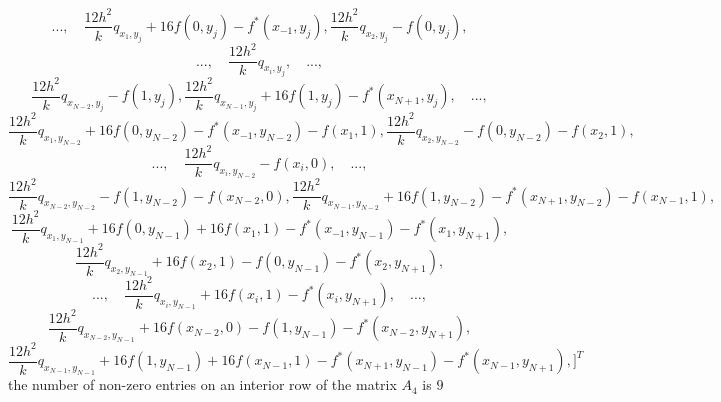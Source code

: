 \documentclass{article}
\begin{document}
\[
...,\quad \frac{12h^2}{k}q_{x_1, y_j} + 16f(0, y_j) - f^{*}(x_{-1}, y_j),\frac{12h^2}{k}q_{x_2, y_j} - f(0, y_j),
\]
\[
 ...,\quad \frac{12h^2}{k}q_{x_i, y_j},\quad...,
\]
\[
\frac{12h^2}{k}q_{x_{N-2}, y_j}  - f(1, y_j), \frac{12h^2}{k}q_{x_{N-1}, y_j} + 16f(1, y_j) - f^{*}(x_{N+1}, y_j),\quad...,
\]
\[
\frac{12h^2}{k}q_{x_1, y_{N-2}} + 16f(0, y_{N-2}) - f^{*}(x_{-1}, y_{N-2}) - f(x_1, 1),\frac{12h^2}{k}q_{x_2, y_{N-2}} - f(0, y_{N-2}) - f(x_2, 1), 
\]
\[
 ...,\quad \frac{12h^2}{k}q_{x_i, y_{N-2}} - f(x_i, 0),\quad...,
\]
\[
\frac{12h^2}{k}q_{x_{N-2}, y_{N-2}}  - f(1, y_{N-2}) - f(x_{N-2}, 0), \frac{12h^2}{k}q_{x_{N-1}, y_{N-2}} + 16f(1, y_{N-2}) - f^{*}(x_{N+1}, y_{N-2}) - f(x_{N-1}, 1),
\]
\[
\frac{12h^2}{k}q_{x_1, y_{N-1}} + 16f(0, y_{N-1}) + 16f(x_1, 1) - f^{*}(x_{-1}, y_{N-1}) - f^{*}(x_1, y_{N+1}),
\]
\[
\frac{12h^2}{k}q_{x_2, y_{N-1}} + 16f(x_2, 1) - f(0, y_{N-1}) - f^{*}(x_2, y_{N+1}), 
\]
\[
 ...,\quad \frac{12h^2}{k}q_{x_i, y_{N-1}} + 16f(x_i, 1) - f^{*}(x_i, y_{N+1}),\quad...,
\]
\[
\frac{12h^2}{k}q_{x_{N-2}, y_{N-1}} + 16f(x_{N-2}, 0) - f(1, y_{N-1}) - f^{*}(x_{N-2}, y_{N+1}),
\]
\[
\frac{12h^2}{k}q_{x_{N-1}, y_{N-1}} + 16f(1, y_{N-1}) + 16f(x_{N-1}, 1) - f^{*}(x_{N+1}, y_{N-1}) - f^{*}(x_{N-1}, y_{N+1}),]^T
\]
the number of non-zero entries on an interior row of the matrix $A_4$ is $9$
\end{document}
